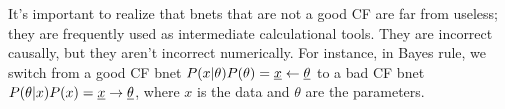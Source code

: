 It's important to realize
that bnets that are not a good CF
are far from useless; they
are frequently used
as intermediate calculational
tools. They are incorrect causally,
but they aren't incorrect numerically.
For instance, in Bayes rule,
we switch from a good CF bnet
$P(x|\theta)P(\theta)={\underline{x}}\leftarrow\underline{\theta}$
to a bad CF bnet
$P(\theta|x)P(x)={\underline{x}}\rightarrow\underline{\theta}$,
where $x$ is the data
and $\theta$ are the parameters.
